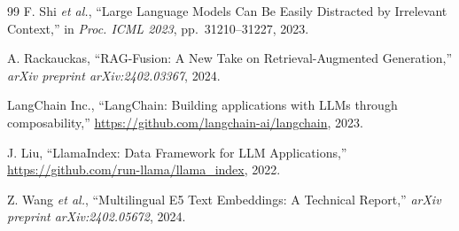 \documentclass[10pt, conference, a4paper]{IEEEtran}
\begin{document}
\begin{thebibliography}{99}
F. Shi \textit{et al.},
``Large Language Models Can Be Easily Distracted by Irrelevant
Context,''
in \textit{Proc. ICML 2023}, pp.~31210--31227, 2023.

A. Rackauckas,
``RAG-Fusion: A New Take on Retrieval-Augmented Generation,''
\textit{arXiv preprint arXiv:2402.03367}, 2024.

LangChain Inc.,
``LangChain: Building applications with LLMs through composability,''
\url{https://github.com/langchain-ai/langchain}, 2023.

J. Liu,
``LlamaIndex: Data Framework for LLM Applications,''
\url{https://github.com/run-llama/llama_index}, 2022.

Z. Wang \textit{et al.},
``Multilingual E5 Text Embeddings: A Technical Report,''
\textit{arXiv preprint arXiv:2402.05672}, 2024.

\end{thebibliography}
\end{document}
